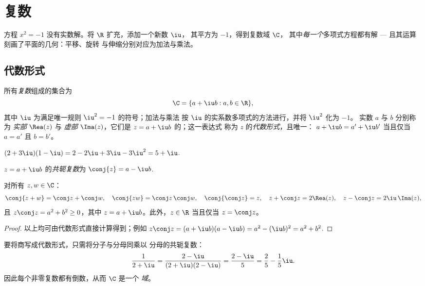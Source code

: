 \chapter{复数}\label{ch:g12:complex}

方程 $x^2 = -1$ 没有实数解。将 $\R$ 扩充，添加一个新数 $\iu$，
其平方为 $-1$，得到复数域 $\C$，
其中\emph{每一个}多项式方程都有解 ---
且其运算刻画了平面的几何：平移、旋转
与伸缩分别对应为加法与乘法。

\section{代数形式}

\begin{definition}[复数]\label{def:g12:complex:def}
所有\emph{复数}组成的集合为
\[
\C = \{a + \iu b : a, b \in \R\},
\]
其中 $\iu$ 为满足唯一规则 $\iu^2 = -1$ 的符号；加法与乘法
按 $\iu$ 的实系数多项式的方法进行，并将 $\iu^2$ 化为 $-1$。
实数 $a$ 与 $b$ 分别称为 \emph{实部}
$\Rea(z)$ 与 \emph{虚部} $\Ima(z)$，它们是 $z = a + \iu b$ 的；这一表达式
称为 $z$ 的\emph{代数形式}，且唯一：
$a + \iu b = a' + \iu b'$ 当且仅当 $a = a'$ 且 $b = b'$。
\end{definition}

\begin{example}
$(2 + 3\iu)(1 - \iu) = 2 - 2\iu + 3\iu - 3\iu^2 = 5 + \iu$.
\end{example}

\begin{definition}[共轭复数]\label{def:g12:complex:conjugate}
$z = a + \iu b$ 的\emph{共轭复数}为
$\conj{z} = a - \iu b$.
\end{definition}

\begin{proposition}[共轭运算的性质]\label{prop:g12:complex:conjugate}
对所有 $z, w \in \C$：
\[
\conj{z + w} = \conj z + \conj w, \quad
\conj{zw} = \conj z\,\conj w, \quad
\conj{\conj z} = z, \quad
z + \conj z = 2\Rea(z), \quad
z - \conj z = 2\iu\,\Ima(z),
\]
且 $z\conj z = a^2 + b^2 \geq 0$，其中 $z = a + \iu b$。此外，$z \in \R$
当且仅当 $z = \conj z$。
\end{proposition}

\begin{proof}
以上均可由代数形式直接计算得到；例如
$z\conj z = (a + \iu b)(a - \iu b) = a^2 - (\iu b)^2 = a^2 + b^2$.
\end{proof}

\begin{method}[复数的除法]\label{met:g12:complex:division}
要将商写成代数形式，只需将分子与分母同乘以
分母的共轭复数：
\[
\frac{1}{2 + \iu} = \frac{2 - \iu}{(2+\iu)(2-\iu)} = \frac{2 - \iu}{5}
= \frac25 - \frac15\iu .
\]
因此每个非零复数都有倒数，从而 $\C$ 是一个
\emph{域}。
\end{method}

